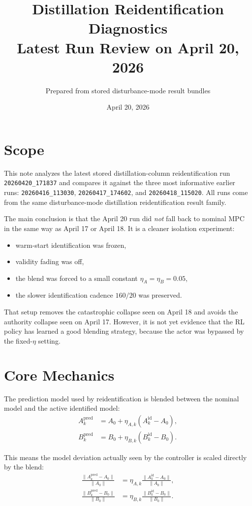 \documentclass[11pt]{article}
\title{Distillation Reidentification Diagnostics\\Latest Run Review on April 20, 2026}
\author{Prepared from stored disturbance-mode result bundles}
\date{April 20, 2026}
\begin{document}
\maketitle

\section*{Scope}
This note analyzes the latest stored distillation-column reidentification run
\texttt{20260420\_171837} and compares it against the three most informative earlier runs:
\texttt{20260416\_113030}, \texttt{20260417\_174602}, and \texttt{20260418\_115020}.
All runs come from the same disturbance-mode distillation reidentification result family.

The main conclusion is that the April 20 run did \emph{not} fall back to nominal MPC in the same way as April 17 or April 18. It is a cleaner isolation experiment:
\begin{itemize}
\item warm-start identification was frozen,
\item validity fading was off,
\item the blend was forced to a small constant $\eta_A=\eta_B=0.05$,
\item the slower identification cadence $160/20$ was preserved.
\end{itemize}

That setup removes the catastrophic collapse seen on April 18 and avoids the authority collapse seen on April 17. However, it is not yet evidence that the RL policy has learned a good blending strategy, because the actor was bypassed by the fixed-$\eta$ setting.

\section*{Core Mechanics}
The prediction model used by reidentification is blended between the nominal model and the active identified model:
\begin{align}
A_k^{\mathrm{pred}} &= A_0 + \eta_{A,k}\left(A_k^{\mathrm{id}} - A_0\right), \\
B_k^{\mathrm{pred}} &= B_0 + \eta_{B,k}\left(B_k^{\mathrm{id}} - B_0\right).
\end{align}

This means the model deviation actually seen by the controller is scaled directly by the blend:
\begin{align}
\frac{\lVert A_k^{\mathrm{pred}} - A_0 \rVert}{\lVert A_0 \rVert}
&=
\eta_{A,k}
\frac{\lVert A_k^{\mathrm{id}} - A_0 \rVert}{\lVert A_0 \rVert}, \\
\frac{\lVert B_k^{\mathrm{pred}} - B_0 \rVert}{\lVert B_0 \rVert}
&=
\eta_{B,k}
\frac{\lVert B_k^{\mathrm{id}} - B_0 \rVert}{\lVert B_0 \rVert}.
\end{align}
\end{document}
